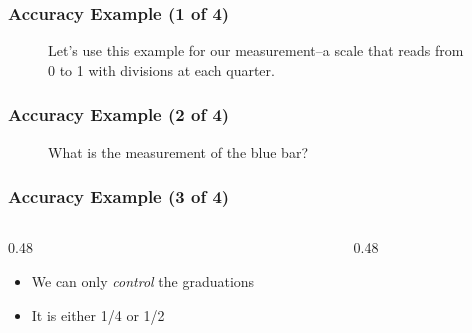 \begin{frame}
	\frametitle{Accuracy Example (1 of 4)}
    \begin{figure}
        \centering
        \resizebox{\columnwidth}{!}{
            
        }
        
        {\footnotesize Let's use this example for our measurement--a scale that reads from 0 to 1 with divisions at each quarter.\par}
    \end{figure}        
\end{frame}

\begin{frame}
	\frametitle{Accuracy Example (2 of 4)}
    \begin{figure}
        \centering
        \resizebox{\columnwidth}{!}{
               
        }
        {\footnotesize What is the measurement of the blue bar?\par}
    \end{figure}        
\end{frame}

\begin{frame}
	\frametitle{Accuracy Example (3 of 4)}

    \begin{columns}
        \begin{column}{0.48\linewidth}
            \begin{itemize}
                \item We can only \emph{control} the graduations
                \item It is either 1/4 or 1/2
            \end{itemize}
        \end{column}
        \begin{column}{0.48\linewidth}
            \begin{figure}
                \centering
                \resizebox{\columnwidth}{!}{
                       
                }
            \end{figure}  
        \end{column}
    \end{columns}          
\end{frame}

